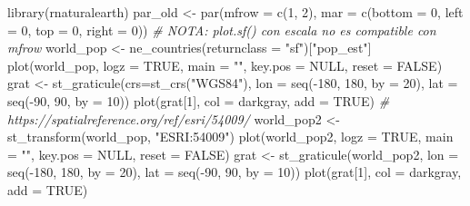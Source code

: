 \documentclass[
  spanish,
]{book}
\newenvironment{Shaded}{\begin{snugshade}}{\end{snugshade}}
\newcommand{\AttributeTok}[1]{\textcolor[rgb]{0.77,0.63,0.00}{#1}}
\newcommand{\CommentTok}[1]{\textcolor[rgb]{0.56,0.35,0.01}{\textit{#1}}}
\newcommand{\ConstantTok}[1]{\textcolor[rgb]{0.00,0.00,0.00}{#1}}
\newcommand{\DecValTok}[1]{\textcolor[rgb]{0.00,0.00,0.81}{#1}}
\newcommand{\FunctionTok}[1]{\textcolor[rgb]{0.00,0.00,0.00}{#1}}
\newcommand{\NormalTok}[1]{#1}
\newcommand{\OtherTok}[1]{\textcolor[rgb]{0.56,0.35,0.01}{#1}}
\newcommand{\SpecialCharTok}[1]{\textcolor[rgb]{0.00,0.00,0.00}{#1}}
\newcommand{\StringTok}[1]{\textcolor[rgb]{0.31,0.60,0.02}{#1}}
\theoremstyle{break}
\begin{document}
\begin{Shaded}
\begin{Highlighting}[]
\FunctionTok{library}\NormalTok{(rnaturalearth) }
\NormalTok{par\_old }\OtherTok{\textless{}{-}} \FunctionTok{par}\NormalTok{(}\AttributeTok{mfrow =} \FunctionTok{c}\NormalTok{(}\DecValTok{1}\NormalTok{, }\DecValTok{2}\NormalTok{), }\AttributeTok{mar =} \FunctionTok{c}\NormalTok{(}\AttributeTok{bottom =} \DecValTok{0}\NormalTok{, }\AttributeTok{left =} \DecValTok{0}\NormalTok{, }\AttributeTok{top =} \DecValTok{0}\NormalTok{, }\AttributeTok{right =} \DecValTok{0}\NormalTok{))}
\CommentTok{\# NOTA: plot.sf() con escala no es compatible con mfrow }
\NormalTok{world\_pop }\OtherTok{\textless{}{-}} \FunctionTok{ne\_countries}\NormalTok{(}\AttributeTok{returnclass =} \StringTok{"sf"}\NormalTok{)[}\StringTok{"pop\_est"}\NormalTok{]}
\FunctionTok{plot}\NormalTok{(world\_pop, }\AttributeTok{logz =} \ConstantTok{TRUE}\NormalTok{, }\AttributeTok{main =} \StringTok{""}\NormalTok{, }\AttributeTok{key.pos =} \ConstantTok{NULL}\NormalTok{, }\AttributeTok{reset =} \ConstantTok{FALSE}\NormalTok{)}
\NormalTok{grat }\OtherTok{\textless{}{-}} \FunctionTok{st\_graticule}\NormalTok{(}\AttributeTok{crs=}\FunctionTok{st\_crs}\NormalTok{(}\StringTok{"WGS84"}\NormalTok{), }\AttributeTok{lon =} \FunctionTok{seq}\NormalTok{(}\SpecialCharTok{{-}}\DecValTok{180}\NormalTok{, }\DecValTok{180}\NormalTok{, }\AttributeTok{by =} \DecValTok{20}\NormalTok{), }\AttributeTok{lat =} \FunctionTok{seq}\NormalTok{(}\SpecialCharTok{{-}}\DecValTok{90}\NormalTok{, }\DecValTok{90}\NormalTok{, }\AttributeTok{by =} \DecValTok{10}\NormalTok{))}
\FunctionTok{plot}\NormalTok{(grat[}\DecValTok{1}\NormalTok{], }\AttributeTok{col =} \StringTok{\textquotesingle{}darkgray\textquotesingle{}}\NormalTok{, }\AttributeTok{add =} \ConstantTok{TRUE}\NormalTok{)}
\CommentTok{\# https://spatialreference.org/ref/esri/54009/}
\NormalTok{world\_pop2 }\OtherTok{\textless{}{-}} \FunctionTok{st\_transform}\NormalTok{(world\_pop, }\StringTok{"ESRI:54009"}\NormalTok{) }
\FunctionTok{plot}\NormalTok{(world\_pop2, }\AttributeTok{logz =} \ConstantTok{TRUE}\NormalTok{, }\AttributeTok{main =} \StringTok{""}\NormalTok{, }\AttributeTok{key.pos =} \ConstantTok{NULL}\NormalTok{, }\AttributeTok{reset =} \ConstantTok{FALSE}\NormalTok{)}
\NormalTok{grat }\OtherTok{\textless{}{-}} \FunctionTok{st\_graticule}\NormalTok{(world\_pop2, }\AttributeTok{lon =} \FunctionTok{seq}\NormalTok{(}\SpecialCharTok{{-}}\DecValTok{180}\NormalTok{, }\DecValTok{180}\NormalTok{, }\AttributeTok{by =} \DecValTok{20}\NormalTok{), }\AttributeTok{lat =} \FunctionTok{seq}\NormalTok{(}\SpecialCharTok{{-}}\DecValTok{90}\NormalTok{, }\DecValTok{90}\NormalTok{, }\AttributeTok{by =} \DecValTok{10}\NormalTok{))}
\FunctionTok{plot}\NormalTok{(grat[}\DecValTok{1}\NormalTok{], }\AttributeTok{col =} \StringTok{\textquotesingle{}darkgray\textquotesingle{}}\NormalTok{, }\AttributeTok{add =} \ConstantTok{TRUE}\NormalTok{)}
\end{Highlighting}
\end{Shaded}
\end{document}
